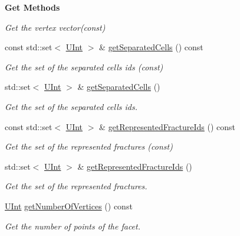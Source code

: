 \begin{Indent}{\bf Get Methods}
\begin{DoxyCompactItemize}
\begin{DoxyCompactList}\small\item\em Get the vertex vector(const) \end{DoxyCompactList}\item 
const std\+::set$<$ \hyperlink{namespaceFVCode3D_a4bf7e328c75d0fd504050d040ebe9eda}{U\+Int} $>$ \& \hyperlink{classFVCode3D_1_1Mesh3D_1_1Facet3D_aa3daf4c15034afd5f92d977fc82f415b}{get\+Separated\+Cells} () const 
\begin{DoxyCompactList}\small\item\em Get the set of the separated cells ids (const) \end{DoxyCompactList}\item 
std\+::set$<$ \hyperlink{namespaceFVCode3D_a4bf7e328c75d0fd504050d040ebe9eda}{U\+Int} $>$ \& \hyperlink{classFVCode3D_1_1Mesh3D_1_1Facet3D_a2eb69a71b8d94403320378795a761ab7}{get\+Separated\+Cells} ()
\begin{DoxyCompactList}\small\item\em Get the set of the separated cells ids. \end{DoxyCompactList}\item 
const std\+::set$<$ \hyperlink{namespaceFVCode3D_a4bf7e328c75d0fd504050d040ebe9eda}{U\+Int} $>$ \& \hyperlink{classFVCode3D_1_1Mesh3D_1_1Facet3D_ae66912e2e920a79192fb19fd297fcf9a}{get\+Represented\+Fracture\+Ids} () const 
\begin{DoxyCompactList}\small\item\em Get the set of the represented fractures (const) \end{DoxyCompactList}\item 
std\+::set$<$ \hyperlink{namespaceFVCode3D_a4bf7e328c75d0fd504050d040ebe9eda}{U\+Int} $>$ \& \hyperlink{classFVCode3D_1_1Mesh3D_1_1Facet3D_af3541b74547584a8442c7bc43f699c02}{get\+Represented\+Fracture\+Ids} ()
\begin{DoxyCompactList}\small\item\em Get the set of the represented fractures. \end{DoxyCompactList}\item 
\hyperlink{namespaceFVCode3D_a4bf7e328c75d0fd504050d040ebe9eda}{U\+Int} \hyperlink{classFVCode3D_1_1Mesh3D_1_1Facet3D_a5ae9fec253c58a2e90abbb2593dba60a}{get\+Number\+Of\+Vertices} () const 
\begin{DoxyCompactList}\small\item\em Get the number of points of the facet. \end{DoxyCompactList}\item 

\end{DoxyCompactItemize}
\end{Indent}
